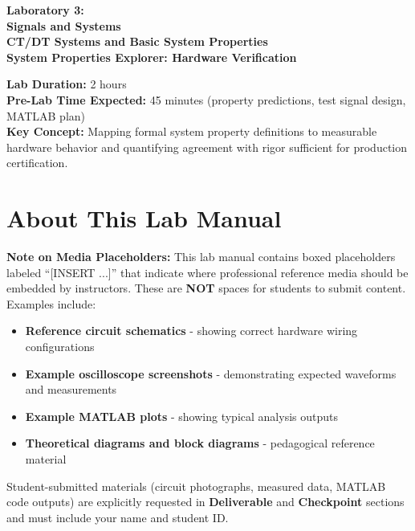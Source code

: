 \documentclass[11pt,letterpaper]{article}
\begin{document}
\begin{center}
\huge{\bf Laboratory 3:}\\
\vspace{0.2in}
\Large{\bf Signals and Systems}\\
\Large{\bf CT/DT Systems and Basic System Properties}\\
\vspace{0.2in}
\normalsize{\bf System Properties Explorer: Hardware Verification}
\end{center}

\vspace{0.3in}
\noindent
\textbf{Lab Duration:} 2 hours\\
\textbf{Pre-Lab Time Expected:} 45 minutes (property predictions, test signal design, MATLAB plan)\\
\textbf{Key Concept:} Mapping formal system property definitions to measurable hardware behavior and quantifying agreement with rigor sufficient for production certification.

\tableofcontents
\clearpage

\section*{About This Lab Manual}

\textbf{Note on Media Placeholders:} This lab manual contains boxed placeholders labeled ``[INSERT ...]'' that indicate where professional reference media should be embedded by instructors. These are \textbf{NOT} spaces for students to submit content. Examples include:

\begin{itemize}
    \item \textbf{Reference circuit schematics} - showing correct hardware wiring configurations
    \item \textbf{Example oscilloscope screenshots} - demonstrating expected waveforms and measurements
    \item \textbf{Example MATLAB plots} - showing typical analysis outputs
    \item \textbf{Theoretical diagrams and block diagrams} - pedagogical reference material
\end{itemize}

\noindent Student-submitted materials (circuit photographs, measured data, MATLAB code outputs) are explicitly requested in \textbf{Deliverable} and \textbf{Checkpoint} sections and must include your name and student ID.
\end{document}
